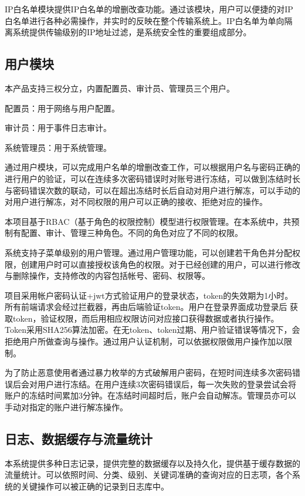 IP白名单模块提供IP白名单的增删改查功能。通过该模块，用户可以便捷的对IP白名单进行各种必需操作，并实时的反映在整个传输系统上。IP白名单为单向隔离系统提供传输级别的IP地址过滤，是系统安全性的重要组成部分。

\subsection{用户模块}

本产品支持三权分立，内置配置员、审计员、管理员三个用户。

配置员：用于网络与用户配置。

审计员：用于事件日志审计。

系统管理员：用于系统管理。

通过用户模块，可以完成用户名单的增删改查工作，可以根据用户名与密码正确的进行用户的验证，可以在连续多次密码错误时对账号进行冻结，可以做到冻结时长与密码错误次数的联动，可以在超出冻结时长后自动对用户进行解冻，可以手动的对用户进行解冻，对不同权限的用户可以正确的接收、拒绝对应的操作。

本项目基于RBAC（基于角色的权限控制）模型进行权限管理。在本系统中，共预制有配置、审计、管理三种角色。不同的角色对应了不同的权限。

系统支持子菜单级别的用户管理。通过用户管理功能，可以创建若干角色并分配权限，创建用户时可以直接授权该角色的权限。对于已经创建的用户，可以进行修改与删除操作，支持修改的内容包括帐号、密码、权限等。

项目采用帐户密码认证+jwt方式验证用户的登录状态，token的失效期为1小时。所有前端请求会经过拦截器，再由后端验证token。用户在登录界面成功登录后 获取token，验证权限，而后用相应权限访问对应接口获得数据或者执行操作。Token采用SHA256算法加密。在无token、token过期、用户验证错误等情况下，会拒绝用户所做查询与操作。通过用户认证机制，可以依据权限做用户操作加以限制。

为了防止恶意使用者通过暴力枚举的方式破解用户密码，在短时间连续多次密码错误后会对用户进行冻结。在用户连续3次密码错误后，每一次失败的登录尝试会将账户的冻结时间累加3分钟。在冻结时间超时后，账户会自动解冻。管理员亦可以手动对指定的账户进行解冻操作。

\subsection{日志、数据缓存与流量统计}

本系统提供多种日志记录，提供完整的数据缓存以及持久化，提供基于缓存数据的流量统计。可以依照时间、分类、级别、关键词准确的查询对应的日志项，各个系统的关键操作可以被正确的记录到日志库中。

